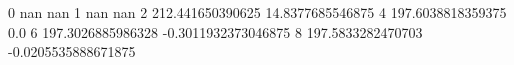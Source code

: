 0 nan nan
1 nan nan
2 212.441650390625 14.8377685546875
4 197.6038818359375 0.0
6 197.3026885986328 -0.3011932373046875
8 197.5833282470703 -0.0205535888671875
